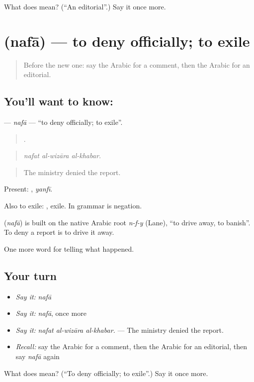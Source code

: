 \begin{tcolorbox}[breakable,colback=teal!4,colframe=teal!35!black,title={Before you move on}]
What does  mean? (\textquotedblleft{}An editorial\textquotedblright{}.) Say it once more.
\end{tcolorbox}
\section[\texorpdfstring{\ar{نفى} (nafā)}{نفى (nafā)}]{ (nafā) — to deny officially; to exile}

\label{lesson:AR-C355-nafa}



\begin{quote}
Before the new one: say the Arabic for a comment, then the Arabic for an editorial.
\end{quote}

\subsection*{You'll want to know: }
\textbf{} — \emph{nafā} — \textquotedblleft{}to deny officially; to exile\textquotedblright{}.

\begin{quote}
  .
\end{quote}

\begin{quote}
\emph{nafat al-wizāra al-khabar.}
\end{quote}

\begin{quote}
The ministry denied the report.
\end{quote}

Present: , \emph{yanfī}.

Also to exile: , exile. In grammar  is negation.

\begin{cousinweb}
\textbf{} (\emph{nafā}) is built on the native Arabic root \emph{n-f-y} (Lane), \textquotedblleft{}to drive away, to banish\textquotedblright{}. To deny a report is to drive it away.
\end{cousinweb}

\begin{grammarlens}[title={What you've built}]
One more word for telling what happened.
\end{grammarlens}

\subsection*{Your turn}
\begin{itemize}
\raggedright
  \item \emph{Say it:} \emph{nafā}
  \item \emph{Say it:} \emph{nafā}, once more
  \item \emph{Say it:} \emph{nafat al-wizāra al-khabar.} — The ministry denied the report.
  \item \emph{Recall:} say the Arabic for a comment, then the Arabic for an editorial, then say \emph{nafā} again
\end{itemize}

\begin{tcolorbox}[breakable,colback=teal!4,colframe=teal!35!black,title={Before you move on}]
What does  mean? (\textquotedblleft{}To deny officially; to exile\textquotedblright{}.) Say it once more.
\end{tcolorbox}
